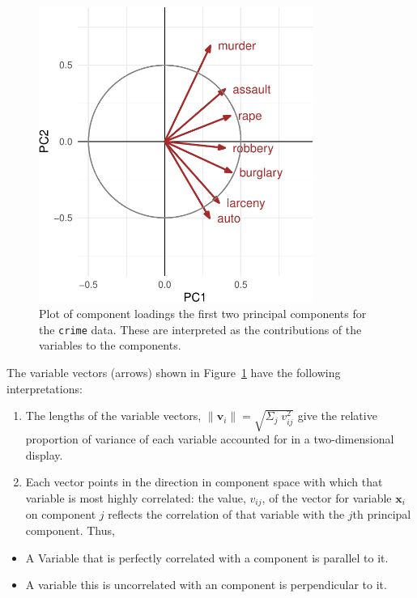 \documentclass[
  letterpaper,
  10pt,
  krantz2]{krantz}
\providecommand{\tightlist}{%
  \setlength{\itemsep}{0pt}\setlength{\parskip}{0pt}}\usepackage{longtable,booktabs,array}
\begin{document}
{\begin{figure}[H]
{\includegraphics[width=0.8\textwidth,height=\textheight]{figs/ch04/fig-crime-vectors-1.pdf}

}

\caption{\label{fig-crime-vectors}Plot of component loadings the first
two principal components for the \texttt{crime} data. These are
interpreted as the contributions of the variables to the components.}

\end{figure}%

The variable vectors (arrows) shown in Figure~\ref{fig-crime-vectors}
have the following interpretations:

\begin{enumerate}
\def\labelenumi{(\arabic{enumi})}
\item
  The lengths of the variable vectors,
  \(\lVert\mathbf{v}_i\rVert = \sqrt{\Sigma_{j} \; v_{ij}^2}\) give the
  relative proportion of variance of each variable accounted for in a
  two-dimensional display.
\item
  Each vector points in the direction in component space with which that
  variable is most highly correlated: the value, \(v_{ij}\), of the
  vector for variable \(\mathbf{x}_i\) on component \(j\) reflects the
  correlation of that variable with the \(j\)th principal component.
  Thus,
\end{enumerate}

\begin{itemize}
\tightlist
\item
  A Variable that is perfectly correlated with a component is parallel
  to it.
\item
  A variable this is uncorrelated with an component is perpendicular to
  it.
\end{itemize}

}
\end{document}
